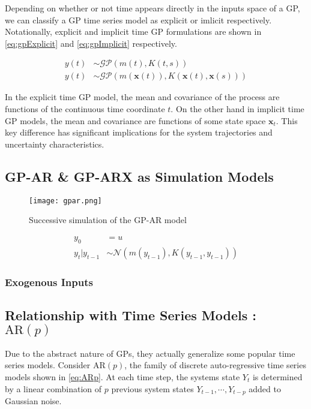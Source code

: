 Depending on whether or not time appears directly in the inputs space of a GP, we can classify a GP time series model as explicit or 
imlicit respectively. Notationally, explicit and implicit time GP formulations are shown in \cref{eq:gpExplicit} and \cref{eq:gpImplicit} respectively.

\begin{align}
    y(t) &\sim \mathcal{GP}(m(t), K(t, s)) \label{eq:gpExplicit}\\
    y(t) &\sim \mathcal{GP}(m(\mathbf{x}(t)), K(\mathbf{x}(t), \mathbf{x}(s))) \label{eq:gpImplicit}
\end{align}

In the explicit time GP model, the mean and covariance of the process are functions of the continuous time coordinate $t$. On the other hand 
in implicit time GP models, the mean and covariance are functions of some state space $\mathbf{x}_t$. This key difference has significant 
implications for the system trajectories and uncertainty characteristics.


\subsection*{GP-AR \& GP-ARX as Simulation Models}

\begin{figure}
    \centering
    \noindent\texttt{[image: gpar.png]}
    \caption{Successive simulation of the GP-AR model}
    \label{fig:gparDiag}
\end{figure}


\begin{align}
    y_0 &= u \label{eq:gpARInit}\\
    y_t \rvert y_{t-1} &\sim \mathcal{N}(m(y_{t - 1}), K(y_{t - 1}, y_{t - 1})) \label{eq:gpARProp}
\end{align}

\subsubsection*{Exogenous Inputs}



\subsection*{Relationship with Time Series Models : $\mathrm{AR}(p)$}

Due to the abstract nature of GPs, they actually generalize some popular time series models. Consider $\mathrm{AR}(p)$, the family of discrete 
auto-regressive time series models shown in \cref{eq:ARp}. At each time step, the systems state $Y_t$ is determined by a linear combination 
of $p$ previous system states $Y_{t-1}, \cdots, Y_{t-p}$ added to Gaussian noise.  

